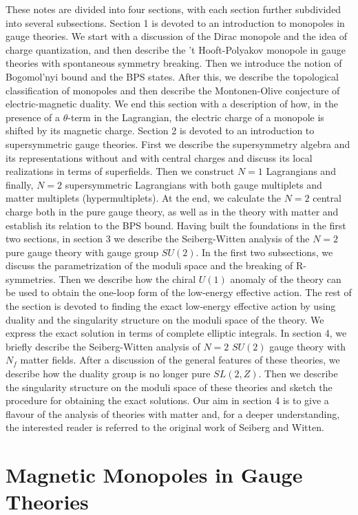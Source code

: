 These notes are divided into four sections, with each section further
subdivided into several subsections. Section 1 is devoted to an
introduction to monopoles in gauge theories. We start with a
discussion of the Dirac monopole and the idea of charge quantization,
and then describe the 't Hooft-Polyakov monopole in gauge theories
with spontaneous symmetry breaking. Then we introduce the notion of
Bogomol'nyi bound and the BPS states. After this, we describe the
topological classification of monopoles and then describe the
Montonen-Olive conjecture of electric-magnetic duality. We end this
section with a description of how, in the presence of a $\theta$-term
in the Lagrangian, the electric charge of a monopole is shifted by its
magnetic charge. Section 2 is devoted to an introduction to
supersymmetric gauge theories. First we describe the supersymmetry
algebra and its representations without and with central charges and
discuss its local realizations in terms of superfields. Then we
construct $N=1$ Lagrangians and finally, $N=2$ supersymmetric
Lagrangians with both gauge multiplets and matter multiplets
(hypermultiplets). At the end, we calculate the $N=2$ central charge
both in the pure gauge theory, as well as in the theory with matter
and establish its relation to the BPS bound. Having built the
foundations in the first two sections, in section 3 we describe the
Seiberg-Witten analysis of the $N=2$ pure gauge theory with gauge
group $SU(2)$. In the first two subsections, we discuss the
parametrization of the moduli space and the breaking of R-symmetries.
Then we describe how the chiral $U(1)$ anomaly of the theory can be
used to obtain the one-loop form of the low-energy effective action.
The rest of the section is devoted to finding the exact low-energy
effective action by using duality and the singularity structure on the
moduli space of the theory. We express the exact solution in terms of
complete elliptic integrals. In section 4, we briefly describe the
Seiberg-Witten analysis of $N=2$ $SU(2)$ gauge theory with $N_f$
matter fields. After a discussion of the general features of these
theories, we describe how the duality group is no longer pure
$SL(2,Z)$. Then we describe the singularity structure on the moduli
space of these theories and sketch the procedure for obtaining the
exact solutions. Our aim in section 4 is to give a flavour of the
analysis of theories with matter and, for a deeper understanding, the
interested reader is referred to the original work of Seiberg and
Witten.

\section{Magnetic Monopoles in Gauge Theories}

